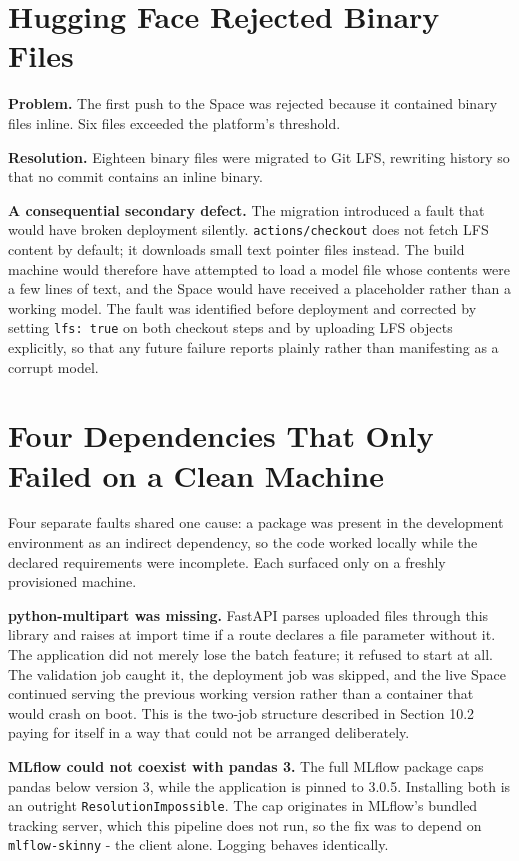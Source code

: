 \documentclass[11pt,a4paper]{report}
\begin{document}
\section{Hugging Face Rejected Binary Files}

\textbf{Problem.} The first push to the Space was rejected because it contained
binary files inline. Six files exceeded the platform's threshold.

\textbf{Resolution.} Eighteen binary files were migrated to Git LFS, rewriting
history so that no commit contains an inline binary.

\textbf{A consequential secondary defect.} The migration introduced a fault that
would have broken deployment silently. \texttt{actions/checkout} does not fetch
LFS content by default; it downloads small text pointer files instead. The build
machine would therefore have attempted to load a model file whose contents were
a few lines of text, and the Space would have received a placeholder rather than
a working model. The fault was identified before deployment and corrected by
setting \texttt{lfs: true} on both checkout steps and by uploading LFS objects
explicitly, so that any future failure reports plainly rather than manifesting
as a corrupt model.

\section{Four Dependencies That Only Failed on a Clean Machine}

Four separate faults shared one cause: a package was present in the development
environment as an indirect dependency, so the code worked locally while the
declared requirements were incomplete. Each surfaced only on a freshly
provisioned machine.

\textbf{python-multipart was missing.} FastAPI parses uploaded files through
this library and raises at import time if a route declares a file parameter
without it. The application did not merely lose the batch feature; it refused to
start at all. The validation job caught it, the deployment job was skipped, and
the live Space continued serving the previous working version rather than a
container that would crash on boot. This is the two-job structure described in
Section 10.2 paying for itself in a way that could not be arranged deliberately.

\textbf{MLflow could not coexist with pandas 3.} The full MLflow package caps
pandas below version 3, while the application is pinned to 3.0.5. Installing
both is an outright \texttt{ResolutionImpossible}. The cap originates in
MLflow's bundled tracking server, which this pipeline does not run, so the fix
was to depend on \texttt{mlflow-skinny} - the client alone. Logging behaves
identically.
\end{document}
